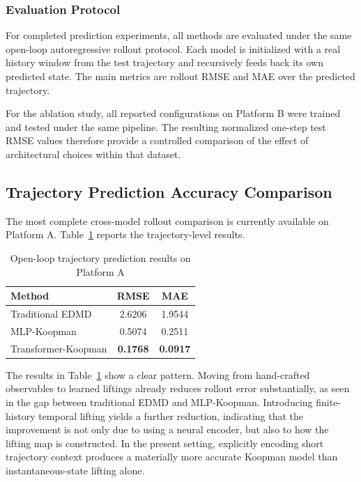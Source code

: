 \documentclass[journal]{IEEEtran}
\begin{document}
\subsubsection{Evaluation Protocol}

For completed prediction experiments, all methods are evaluated under the same open-loop autoregressive rollout protocol. Each model is initialized with a real history window from the test trajectory and recursively feeds back its own predicted state. The main metrics are rollout RMSE and MAE over the predicted trajectory.

For the ablation study, all reported configurations on Platform B were trained and tested under the same pipeline. The resulting normalized one-step test RMSE values therefore provide a controlled comparison of the effect of architectural choices within that dataset.

\subsection{Trajectory Prediction Accuracy Comparison}

The most complete cross-model rollout comparison is currently available on Platform A. Table~\ref{tab:prediction_platform_a} reports the trajectory-level results.

\begin{table}[!t]
\renewcommand{\arraystretch}{1.2}
\caption{Open-loop trajectory prediction results on Platform A}
\label{tab:prediction_platform_a}
\centering
\begin{tabular}{lcc}
\hline\hline
Method & RMSE & MAE \\
\hline
Traditional EDMD & 2.6206 & 1.9544 \\
MLP-Koopman & 0.5074 & 0.2511 \\
Transformer-Koopman & \textbf{0.1768} & \textbf{0.0917} \\
\hline\hline
\end{tabular}
\end{table}

The results in Table~\ref{tab:prediction_platform_a} show a clear pattern. Moving from hand-crafted observables to learned liftings already reduces rollout error substantially, as seen in the gap between traditional EDMD and MLP-Koopman. Introducing finite-history temporal lifting yields a further reduction, indicating that the improvement is not only due to using a neural encoder, but also to how the lifting map is constructed. In the present setting, explicitly encoding short trajectory context produces a materially more accurate Koopman model than instantaneous-state lifting alone.
\end{document}
